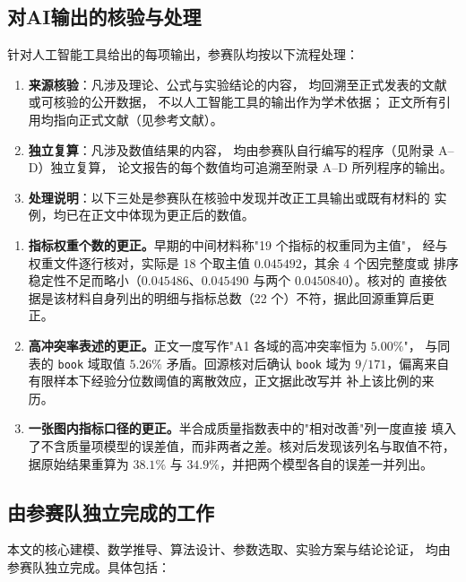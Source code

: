 \documentclass[bwprint]{gmcmthesis}
\numberwithin{equation}{section}
\numberwithin{figure}{section}
\numberwithin{table}{section}
\begin{document}
\begin{appendices}
\subsection{对AI输出的核验与处理}

针对人工智能工具给出的每项输出，参赛队均按以下流程处理：

\begin{enumerate}
  \item \textbf{来源核验}：凡涉及理论、公式与实验结论的内容，
        均回溯至正式发表的文献或可核验的公开数据，
        不以人工智能工具的输出作为学术依据；
        正文所有引用均指向正式文献（见参考文献）。
  \item \textbf{独立复算}：凡涉及数值结果的内容，
        均由参赛队自行编写的程序（见附录 A--D）独立复算，
        论文报告的每个数值均可追溯至附录 A--D 所列程序的输出。
  \item \textbf{处理说明}：以下三处是参赛队在核验中发现并改正工具输出或既有材料的
        实例，均已在正文中体现为更正后的数值。
\end{enumerate}

\begin{enumerate}
  \item \textbf{指标权重个数的更正。}早期的中间材料称"19 个指标的权重同为主值"，
        经与权重文件逐行核对，实际是 18 个取主值 $0.045492$，其余 4 个因完整度或
        排序稳定性不足而略小（$0.045486$、$0.045490$ 与两个 $0.0450840$）。核对的
        直接依据是该材料自身列出的明细与指标总数（22 个）不符，据此回源重算后更正。
  \item \textbf{高冲突率表述的更正。}正文一度写作"A1 各域的高冲突率恒为 $5.00\%$"，
        与同表的 \texttt{book} 域取值 $5.26\%$ 矛盾。回源核对后确认 \texttt{book}
        域为 $9/171$，偏离来自有限样本下经验分位数阈值的离散效应，正文据此改写并
        补上该比例的来历。
  \item \textbf{一张图内指标口径的更正。}半合成质量指数表中的"相对改善"列一度直接
        填入了不含质量项模型的误差值，而非两者之差。核对后发现该列名与取值不符，
        据原始结果重算为 $38.1\%$ 与 $34.9\%$，并把两个模型各自的误差一并列出。
\end{enumerate}


\subsection{由参赛队独立完成的工作}

本文的核心建模、数学推导、算法设计、参数选取、实验方案与结论论证，
均由参赛队独立完成。具体包括：


\end{appendices}
\end{document}
